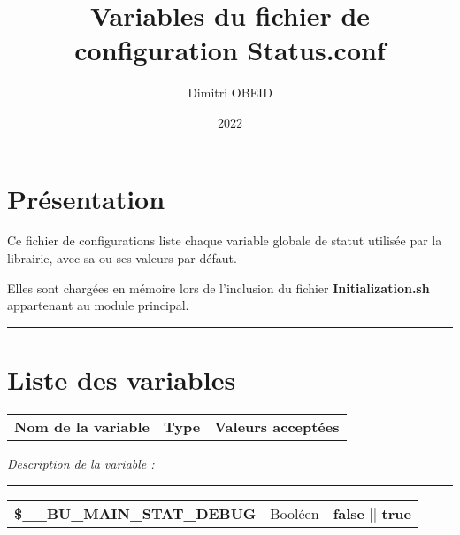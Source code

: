 \documentclass[a4paper,10pt]{article}
\title{\color{sec1}Variables du fichier de configuration \color{path}Status.conf}\color{text}
\author{Dimitri OBEID}
\date{2022}
\begin{document}
\maketitle
\newpage

\hypertarget{contents}{}
\tableofcontents
\newpage

\color{sec1}
\section{Présentation}\color{text}

\begin{justify}
    Ce fichier de configurations liste chaque variable globale de statut utilisée par la librairie, avec sa ou ses valeurs par défaut.
\end{justify}

\begin{justify}
    Elles sont chargées en mémoire lors de l'inclusion du fichier \textbf{\color{path}Initialization.sh} appartenant au module principal.
\end{justify}




\color{sec1}\par\noindent\rule{\textwidth}{0.4pt}\color{text}

\color{sec1}
\section{Liste des variables}\color{text}

\begin{justify}
    \begin{tabular}{l|l|l}
        \textbf{Nom de la variable} & \textbf{Type} & \textbf{Valeurs acceptées}
    \end{tabular}
\end{justify}

\begin{justify}
    \textit{Description de la variable :}
\end{justify}


\par\noindent\rule{\textwidth}{0.4pt}

\begin{justify}
    \begin{tabular}{l|l|l}
        \textbf{\color{vars}\$\_\_BU\_MAIN\_STAT\_DEBUG}  & Booléen & \textbf{false} || \textbf{true} \\[1\baselineskip]
    \end{tabular}
\end{justify}
\end{document}
